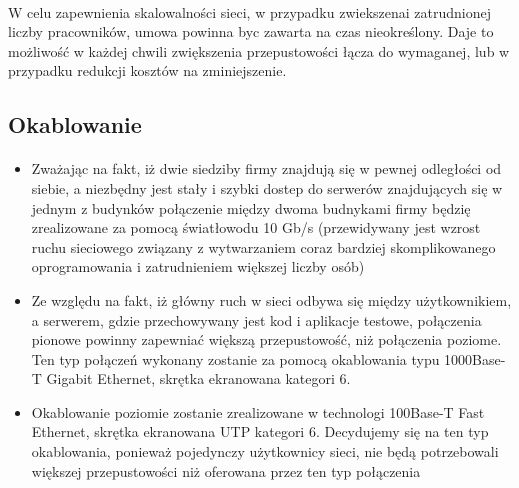 \paragraph{}
W celu zapewnienia skalowalności sieci, w przypadku zwiekszenai zatrudnionej liczby pracowników, umowa powinna byc zawarta na czas nieokreślony. Daje to możliwość w każdej chwili zwiększenia przepustowości łącza do wymaganej, lub w przypadku redukcji kosztów na zminiejszenie.


\subsection{Okablowanie}
\paragraph{}


\begin{itemize}
  \item Zważając na fakt, iż dwie siedziby firmy znajdują się w pewnej odległości od siebie, a niezbędny jest stały i szybki dostep do serwerów znajdujących się w jednym z budynków połączenie między dwoma budnykami firmy będzię zrealizowane za pomocą światłowodu 10 Gb/s (przewidywany jest wzrost ruchu sieciowego związany z wytwarzaniem coraz bardziej skomplikowanego oprogramowania i zatrudnieniem większej liczby osób)

  \item Ze względu na fakt, iż główny ruch w sieci odbywa się między użytkownikiem, a serwerem, gdzie przechowywany jest kod i aplikacje testowe, połączenia pionowe powinny zapewniać większą przepustowość, niż połączenia  poziome. Ten typ połączeń wykonany zostanie za pomocą okablowania typu 1000Base-T Gigabit Ethernet, skrętka ekranowana kategori 6.

  \item Okablowanie poziomie zostanie zrealizowane w technologi 100Base-T Fast Ethernet, skrętka ekranowana UTP kategori 6. Decydujemy się na ten typ okablowania, ponieważ pojedynczy użytkownicy sieci, nie będą potrzebowali większej przepustowości niż oferowana przez ten typ połączenia

\end{itemize}